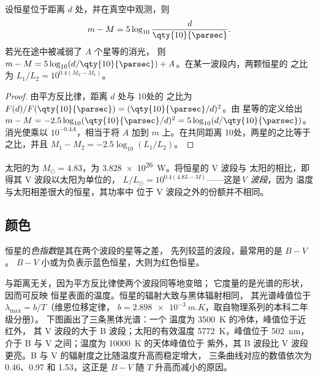 \begin{proposition}[距离模数]\label{prop:b1:observing-the-sky:modulus}
设恒星位于距离 $d$ 处，并在真空中观测，则
\[
  m - M = 5\log_{10}\frac{d}{\qty{10}{\parsec}} .
\]
若光在途中被减弱了 $A$ 个星等的消光，
则 $m - M = 5\log_{10}(d/\qty{10}{\parsec}) + A$。在某一波段内，两颗恒星的
之比为 $L_1/L_2 = 10^{0.4(M_2 - M_1)}$。
\end{proposition}

\begin{proof}
由平方反比律，距离 $d$ 处与 \qty{10}{\parsec}处的
之比为 $F(d)/F(\qty{10}{\parsec}) = (\qty{10}{\parsec}/d)^2$。由
星等的定义给出 $m - M = -2.5\log_{10}(\qty{10}{\parsec}/d)^2
= 5\log_{10}(d/\qty{10}{\parsec})$。消光使乘以
$10^{-0.4A}$，相当于将 $A$ 加到 $m$ 上。在共同距离
\qty{10}{\parsec}处，两星的之比等于之比，并且
$M_1 - M_2 = -2.5\log_{10}(L_1/L_2)$。
\end{proof}

太阳的为 $M_\odot = 4.83$，为
\qty{3.828e26}{W}。将恒星的 V 波段与
太阳的相比，即得其 V 波段以太阳为单位的，
$L/L_\odot = 10^{0.4(4.83 - M)}$——这是\emph{V 波段}，因为
温度与太阳相差很大的恒星，其功率中
位于 V 波段之外的份额并不相同。

\subsection*{颜色}

\begin{definition}[色指数]\label{def:b1:observing-the-sky:colour-index}
恒星的\emph{色指数}是其在两个波段的星等之差，
先列较蓝的波段，最常用的是 $B - V$。
$B - V$ 小或为负表示蓝色恒星，大则为红色恒星。
\end{definition}

与距离无关，因为平方反比律使两个波段同等地变暗；
它度量的是光谱的形状，因而可反映
恒星表面的温度。恒星的辐射大致与黑体辐射相同，
其光谱峰值位于 $\lambda_\mathrm{max} = b/T$（维恩位移定律，
$b = \qty{2.898e-3}{m.K}$，取自物理系列的本科二年级分册）。
下图画出了三条黑体光谱：一个
温度为 \qty{3500}{K} 的冷体，峰值位于近红外，
其 V 波段的大于 B 波段；太阳的有效温度 \qty{5772}{K}，峰值位于
\qty{502}{nm}，介于 B 与 V 之间；温度为 \qty{10000}{K} 的天体峰值位于
紫外，其 B 波段比 V 波段更亮。B 与 V 的辐射度之比随温度升高而稳定增大，
三条曲线对应的数值依次为 \num{0.46}、\num{0.97} 和
\num{1.53}，这正是 $B - V$ 随 $T$ 升高而减小的原因。

